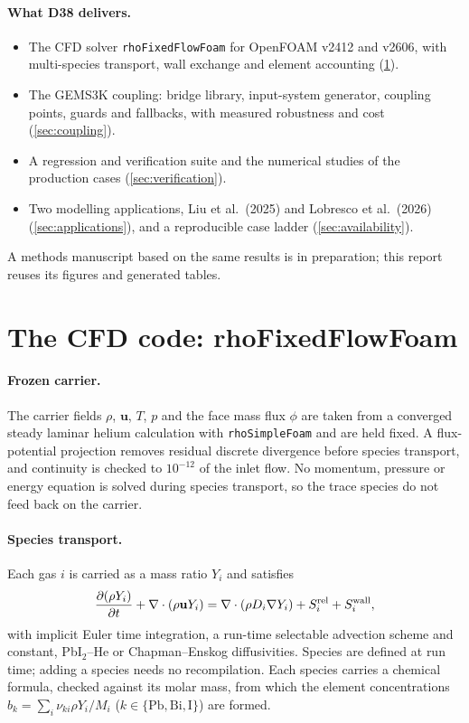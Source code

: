 \documentclass[11pt,a4paper]{article}
\newcommand{\vect}[1]{\mathbf{#1}}
\begin{document}
\paragraph{What D38 delivers.}
\begin{itemize}
\item The CFD solver \texttt{rhoFixedFlowFoam} for OpenFOAM v2412 and
  v2606, with
  multi-species transport, wall exchange and element accounting
  (\cref{sec:cfd}).
\item The GEMS3K coupling: bridge library, input-system generator,
  coupling points, guards and fallbacks, with measured robustness and
  cost (\cref{sec:coupling}).
\item A regression and verification suite and the numerical studies
  of the production cases (\cref{sec:verification}).
\item Two modelling applications, Liu et al.\ (2025) and Lobresco et
  al.\ (2026) (\cref{sec:applications}), and a reproducible case ladder
  (\cref{sec:availability}).
\end{itemize}
A methods manuscript based on the same results is in preparation; this
report reuses its figures and generated tables.



\section{The CFD code: rhoFixedFlowFoam}
\label{sec:cfd}

\paragraph{Frozen carrier.} The carrier fields $\rho$, $\vect u$, $T$,
$p$ and the face mass flux $\phi$ are taken from a converged steady
laminar helium calculation with \texttt{rhoSimpleFoam} and are held
fixed. A flux-potential projection removes residual discrete divergence
before species transport, and continuity is checked to $10^{-12}$ of the
inlet flow. No momentum, pressure or energy equation is solved during
species transport, so the trace species do not feed back on the carrier.

\paragraph{Species transport.} Each gas $i$ is carried as a mass ratio
$Y_i$ and satisfies
\begin{equation}
 \frac{\partial(\rho Y_i)}{\partial t}+\nabla\cdot(\rho\vect u Y_i)
 =\nabla\cdot(\rho D_i\nabla Y_i)+S_i^{\rm rel}+S_i^{\rm wall},
 \label{eq:transport}
\end{equation}
with implicit Euler time integration, a run-time selectable advection
scheme and constant, PbI$_2$--He or Chapman--Enskog diffusivities.
Species are defined at run time; adding a species needs no recompilation.
Each species carries a chemical formula, checked against its molar mass,
from which the element concentrations
$b_k=\sum_i\nu_{ki}\rho Y_i/M_i$ ($k\in\{\mathrm{Pb,Bi,I}\}$) are
formed.
\end{document}
